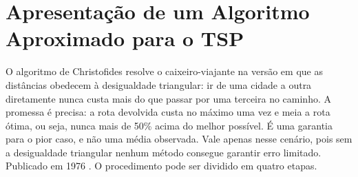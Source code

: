 \section{Apresentação de um Algoritmo Aproximado para o TSP}

O algoritmo de Christofides resolve o caixeiro-viajante na versão em que as
distâncias obedecem à desigualdade triangular: ir de uma cidade a outra
diretamente nunca custa mais do que passar por uma terceira no caminho. A
promessa é precisa: a rota devolvida custa no máximo uma vez e meia a rota
ótima, ou seja, nunca mais de 50\% acima do melhor possível. É uma garantia
para o pior caso, e não uma média observada. Vale apenas nesse cenário, pois
sem a desigualdade triangular nenhum método consegue garantir erro limitado.
Publicado em 1976 \cite{christofides1976}. O procedimento pode ser dividido em 
quatro etapas.


